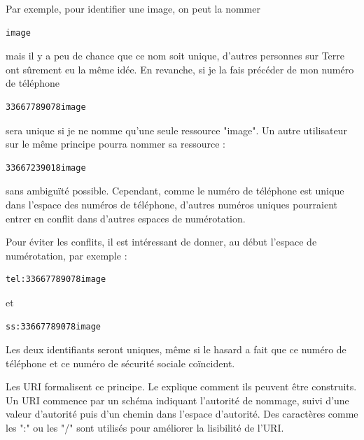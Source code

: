 Par exemple, pour identifier une image, on peut la nommer

\begin{lstlisting}[backgroundcolor = \color{yellow!20}]
image
\end{lstlisting}

\noindent

mais il y a peu de chance que ce nom soit unique, d'autres personnes sur Terre ont sûrement eu la même idée. En revanche, si je la fais précéder de mon numéro de téléphone

\begin{lstlisting}[backgroundcolor = \color{yellow!20}, 
                    basicstyle= \ttfamily]
33667789078image
\end{lstlisting}

\noindent
 sera unique si je ne nomme qu'une seule ressource "image". Un autre utilisateur sur le même principe pourra nommer sa ressource :

\begin{lstlisting}[backgroundcolor = \color{yellow!20}, 
                    basicstyle= \ttfamily]
33667239018image
\end{lstlisting}

\noindent
sans ambiguïté possible. Cependant, comme le numéro de téléphone est unique dans l'espace des numéros de téléphone, d'autres numéros uniques pourraient entrer en conflit dans d'autres espaces de numérotation. 

Pour éviter les conflits, il est intéressant de donner, au début l'espace de numérotation, par exemple :

\begin{lstlisting}[backgroundcolor = \color{yellow!20}, 
                    basicstyle= \ttfamily]
tel:33667789078image
\end{lstlisting}

\noindent
et

\begin{lstlisting}[backgroundcolor = \color{yellow!20}, 
                    basicstyle= \ttfamily]
ss:33667789078image
\end{lstlisting}

\noindent
Les deux identifiants seront uniques, même si le hasard a fait que ce numéro de téléphone et ce numéro de sécurité sociale coïncident.

      \vspace{1em}


Les \ac{URI} formalisent ce principe. Le  explique comment ils peuvent être construits. Un URI commence par un schéma indiquant l’autorité de nommage, suivi d’une valeur d’autorité puis d’un chemin dans l’espace d’autorité. Des caractères comme les ":" ou les "/" sont utilisés pour améliorer la lisibilité de l'\ac{URI}.



